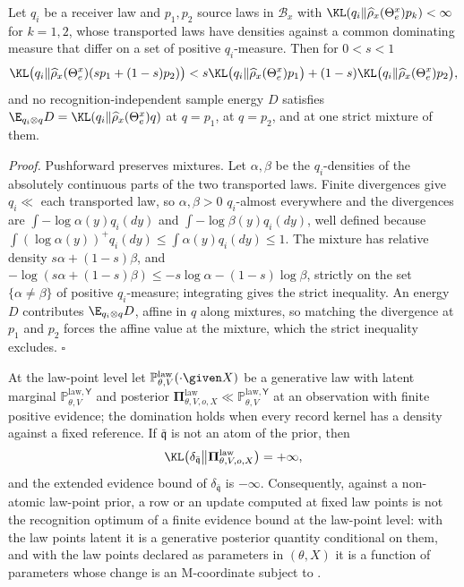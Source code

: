 Let $q_i$ be a receiver law and $p_1,p_2$ source laws in $\mathcal B_x$ with
$\KL(q_i\Vert\widehat\rho_x(\Theta_e^x)p_k)<\infty$ for $k=1,2$, whose transported laws have densities
against a common dominating measure that differ on a set of positive $q_i$-measure. Then for $0<s<1$
\[
\KL\bigl(q_i\Vert\widehat\rho_x(\Theta_e^x)(sp_1+(1-s)p_2)\bigr)
<s\KL\bigl(q_i\Vert\widehat\rho_x(\Theta_e^x)p_1\bigr)+(1-s)\KL\bigl(q_i\Vert\widehat\rho_x(\Theta_e^x)p_2\bigr),
\]
and no recognition-independent sample energy $D$ satisfies
$\E_{q_i\otimes q}D=\KL(q_i\Vert\widehat\rho_x(\Theta_e^x)q)$ at $q=p_1$, at $q=p_2$, and at one strict
mixture of them. 

\noindent\emph{Proof.}
Pushforward preserves mixtures. Let $\alpha,\beta$ be the $q_i$-densities of the absolutely continuous parts
of the two transported laws. Finite divergences give $q_i\ll$ each transported law, so $\alpha,\beta>0$
$q_i$-almost everywhere and the divergences are $\int-\log\alpha(y)q_i(dy)$ and $\int-\log\beta(y)q_i(dy)$,
well defined because $\int(\log\alpha(y))^+q_i(dy)\leq\int\alpha(y)q_i(dy)\leq1$. The mixture has relative
density $s\alpha+(1-s)\beta$, and $-\log(s\alpha+(1-s)\beta)\leq-s\log\alpha-(1-s)\log\beta$, strictly on the
set $\{\alpha\neq\beta\}$ of positive $q_i$-measure; integrating gives the strict inequality. An energy $D$
contributes $\E_{q_i\otimes q}D$, affine in $q$ along mixtures, so matching the divergence at $p_1$ and $p_2$
forces the affine value at the mixture, which the strict inequality excludes. \hfill$\square$

At the law-point level let $\mathbb P^{\mathrm{law}}_{\theta,V}(\cdot\given X)$ be a generative law with
latent marginal $\mathbb P^{\mathrm{law},\mathsf Y}_{\theta,V}$ and posterior
$\boldsymbol\Pi^{\mathrm{law}}_{\theta,V,o,X}\ll\mathbb P^{\mathrm{law},\mathsf Y}_{\theta,V}$ at an observation
with finite positive evidence; the domination holds when every record kernel has a density against a fixed
reference. If $\bar{\mathfrak q}$ is not an atom of the prior, then
\begin{equation}
\KL\bigl(\delta_{\bar{\mathfrak q}}\big\Vert\boldsymbol\Pi^{\mathrm{law}}_{\theta,V,o,X}\bigr)=+\infty,
\label{eq:prob-law-point-point-mass}
\end{equation}
and the extended evidence bound of $\delta_{\bar{\mathfrak q}}$ is $-\infty$. Consequently, against a
non-atomic law-point prior, a row or an update computed at fixed law points is not the recognition
optimum of a finite evidence bound at the law-point level: with the law points latent it is a generative
posterior quantity conditional on them, and with the law points declared as parameters in $(\theta,X)$ it
is a function of parameters whose change is an M-coordinate subject to
. 

